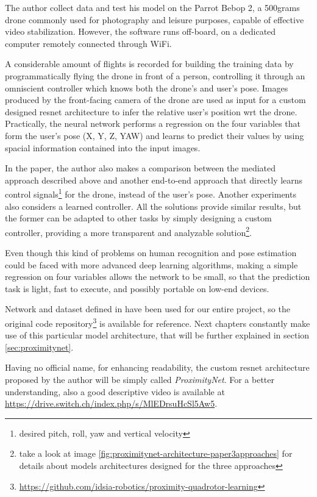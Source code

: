 The author collect data and test his model on the Parrot Bebop 2, a 500grams drone commonly used for photography and leisure purposes, capable of effective video stabilization. However, the software runs off-board, on a dedicated computer remotely connected through WiFi. 

A considerable amount of flights is recorded for building the training data by programmatically flying the drone in front of a person, controlling it through an omniscient controller which knows both the drone's and user's pose. Images produced by the front-facing camera of the drone are used as input for a custom designed \gls{resnet} architecture to infer the relative user's position \gls{wrt} the drone. Practically, the neural network performs a regression on the four variables that form the user's pose (X, Y, Z, YAW) and learns to predict their values by using spacial information contained into the input images. 

In the paper, the author also makes a comparison between the mediated approach described above and another end-to-end approach that directly learns control signals\footnote{desired pitch, roll, yaw and vertical velocity} for the drone, instead of the user's pose. Another experiments also considers a learned controller. All the solutions provide similar results, but the former can be adapted to other tasks by simply designing a custom controller, providing a more transparent and analyzable solution\footnote{take a look at image \ref{fig:proximitynet-architecture-paper3approaches} for details about models architectures designed for the three approaches}.

Even though this kind of problems on human recognition and pose estimation could be faced with more advanced deep learning algorithms, making a simple regression on four variables allows the network to be small, so that the prediction task is light, fast to execute, and possibly portable on low-end devices.

\medskip

Network and dataset defined in \cite{mantegazza2019visionbased} have been used for our entire project, so the original code repository\footnote{\url{https://github.com/idsia-robotics/proximity-quadrotor-learning}} is available for reference. Next chapters constantly make use of this particular model architecture, that will be further explained in section \ref{sec:proximitynet}. 

Having no official name, for enhancing readability, the custom \gls{resnet} architecture proposed by the author will be simply called \textit{ProximityNet}. For a better understanding, also a good descriptive video is available at \url{https://drive.switch.ch/index.php/s/MlEDrsuHcSl5Aw5}.



